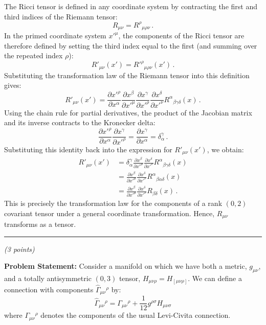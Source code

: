 \documentclass[12pt]{article}
\newcommand{\be}{\begin{equation}}
\newcommand{\ee}{\end{equation}}
\newcounter{quesno}
\newcommand{\ques}[1]{\vspace{2em}\stepcounter{quesno}
\noindent{\bf Question \thequesno.} \emph{(#1 points)\\}
}
\begin{document}
The Ricci tensor is defined in any coordinate system by contracting the first and third indices of the Riemann tensor:
\be
R_{\mu\nu} = R^\rho{}_{\mu\rho\nu} \,.
\ee
In the primed coordinate system $x'^\mu$, the components of the Ricci tensor are therefore defined by setting the third index equal to the first (and summing over the repeated index $\rho$):
\be
R'_{\mu\nu}(x') = R'^\rho{}_{\mu\rho\nu}(x') \,.
\ee
Substituting the transformation law of the Riemann tensor into this definition gives:
\be
R'_{\mu\nu}(x') = \frac{\partial x'^\rho}{\partial x^\alpha} \frac{\partial x^\beta}{\partial x'^\mu} \frac{\partial x^\gamma}{\partial x'^\rho} \frac{\partial x^\delta}{\partial x'^\nu} R^\alpha{}_{\beta\gamma\delta}(x) \,.
\ee
Using the chain rule for partial derivatives, the product of the Jacobian matrix and its inverse contracts to the Kronecker delta:
\be
\frac{\partial x'^\rho}{\partial x^\alpha} \frac{\partial x^\gamma}{\partial x'^\rho} = \frac{\partial x^\gamma}{\partial x^\alpha} = \delta^\gamma_\alpha \,.
\ee
Substituting this identity back into the expression for $R'_{\mu\nu}(x')$, we obtain:
\begin{align}
R'_{\mu\nu}(x') &= \delta^\gamma_\alpha \frac{\partial x^\beta}{\partial x'^\mu} \frac{\partial x^\delta}{\partial x'^\nu} R^\alpha{}_{\beta\gamma\delta}(x) \nonumber\\
&= \frac{\partial x^\beta}{\partial x'^\mu} \frac{\partial x^\delta}{\partial x'^\nu} R^\alpha{}_{\beta\alpha\delta}(x) \nonumber\\
&= \frac{\partial x^\beta}{\partial x'^\mu} \frac{\partial x^\delta}{\partial x'^\nu} R_{\beta\delta}(x) \,.
\end{align}
This is precisely the transformation law for the components of a rank $(0,2)$ covariant tensor under a general coordinate transformation. Hence, $R_{\mu\nu}$ transforms as a tensor.

\vspace{1em}
\hrule

\ques{3}
\textbf{Problem Statement:} Consider a manifold on which we have both a metric, $g_{\mu\nu}$, and a totally antisymmetric $(0,3)$ tensor, $H_{\mu\nu\rho} = H_{[\mu\nu\rho]}$. We can define a connection with components $\hat\Gamma_{\mu\nu}{}^\rho$ by:
\be
\hat \Gamma_{\mu\nu}{}^\rho = \Gamma_{\mu\nu}{}^\rho + \frac{1}{12} g^{\rho \sigma} H_{\mu\nu\sigma}
\label{stringconn}
\ee
where $\Gamma_{\mu\nu}{}^\rho$ denotes the components of the usual Levi-Civita connection.
\end{document}
